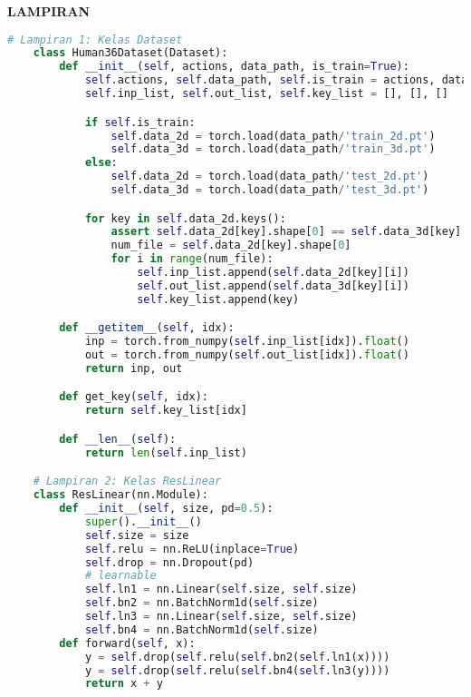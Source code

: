 \newpage %
\singlespacing
\begin{center}
    \begin{large}\textbf{LAMPIRAN}\\\end{large}
\end{center}
\vspace{5mm}


\begin{lstlisting}[language=Python,multicols=2,basicstyle=\scriptsize\mdseries,breaklines=true]
    # Lampiran 1: Kelas Dataset
    class Human36Dataset(Dataset):
        def __init__(self, actions, data_path, is_train=True):
            self.actions, self.data_path, self.is_train = actions, data_path, is_train
            self.inp_list, self.out_list, self.key_list = [], [], []

            if self.is_train:
                self.data_2d = torch.load(data_path/'train_2d.pt')
                self.data_3d = torch.load(data_path/'train_3d.pt')
            else:
                self.data_2d = torch.load(data_path/'test_2d.pt')
                self.data_3d = torch.load(data_path/'test_3d.pt')

            for key in self.data_2d.keys():
                assert self.data_2d[key].shape[0] == self.data_3d[key].shape[0]
                num_file = self.data_2d[key].shape[0]
                for i in range(num_file):
                    self.inp_list.append(self.data_2d[key][i])
                    self.out_list.append(self.data_3d[key][i])
                    self.key_list.append(key)

        def __getitem__(self, idx):
            inp = torch.from_numpy(self.inp_list[idx]).float()
            out = torch.from_numpy(self.out_list[idx]).float()
            return inp, out

        def get_key(self, idx):
            return self.key_list[idx]

        def __len__(self):
            return len(self.inp_list)

    # Lampiran 2: Kelas ResLinear
    class ResLinear(nn.Module):
        def __init__(self, size, pd=0.5):
            super().__init__()
            self.size = size
            self.relu = nn.ReLU(inplace=True)
            self.drop = nn.Dropout(pd)
            # learnable
            self.ln1 = nn.Linear(self.size, self.size)
            self.bn2 = nn.BatchNorm1d(self.size)
            self.ln3 = nn.Linear(self.size, self.size)
            self.bn4 = nn.BatchNorm1d(self.size)
        def forward(self, x):
            y = self.drop(self.relu(self.bn2(self.ln1(x))))
            y = self.drop(self.relu(self.bn4(self.ln3(y))))
            return x + y


\end{lstlisting}
